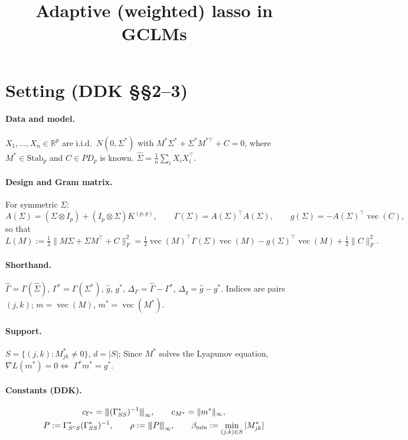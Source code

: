 \documentclass[11pt,a4paper]{article}
\title{\textbf{Adaptive (weighted) lasso in GCLMs}\\[0.4em]}
\author{}
\date{}
\numberwithin{equation}{section}
\theoremstyle{plain}
\theoremstyle{remark}
\newcommand{\opnorm}[1]{{\vert\kern-0.25ex\vert\kern-0.25ex\vert #1 \vert\kern-0.25ex\vert\kern-0.25ex\vert}}
\DeclareMathOperator{\vect}{vec}
\begin{document}
\maketitle

\section{Setting (DDK \S\S2--3)}\label{sec:setting}

\paragraph{Data and model.} $X_1,\dots,X_n\in\mathbb R^p$ are i.i.d.\ $N(0,\Sigma^*)$ with $M^*\Sigma^*+\Sigma^*M^{*\top}+C=0$, where $M^*\in\mathrm{Stab}_p$ and $C\in PD_p$ is known. $\hat\Sigma=\frac1n\sum_iX_iX_i^\top$.

\paragraph{Design and Gram matrix.} For symmetric $\Sigma$:
\[
A(\Sigma)=(\Sigma\otimes I_p)+(I_p\otimes\Sigma)K^{(p,p)},\qquad
\Gamma(\Sigma)=A(\Sigma)^\top A(\Sigma),\qquad
g(\Sigma)=-A(\Sigma)^\top\vect(C),
\]
so that
\[
L(M) := \tfrac12\|M\Sigma+\Sigma M^\top+C\|_F^2=\tfrac12\vect(M)^\top\Gamma(\Sigma)\vect(M)-g(\Sigma)^\top\vect(M)+\tfrac12\|C\|_F^2 .
\]

\paragraph{Shorthand.} $\hat\Gamma=\Gamma(\hat\Sigma)$, $\Gamma^*=\Gamma(\Sigma^*)$, $\hat g$, $g^*$, $\Delta_\Gamma=\hat\Gamma-\Gamma^*$, $\Delta_g=\hat g-g^*$. Indices are pairs $(j,k)$; $m=\vect(M)$, $m^*=\vect(M^*)$.

\paragraph{Support.} $S=\{(j,k):M^*_{jk}\ne0\}$, $d=|S|$; Since $M^*$ solves the Lyapunov equation, $\nabla L(m^*) = 0 \iff$ $\Gamma^*m^*=g^*$.

\paragraph{Constants (DDK).}
\begin{gather*}
c_{\Gamma^*}=\opnorm{(\Gamma^*_{SS})^{-1}}_\infty,\qquad c_{M^*}=\|m^*\|_\infty,\\
P:=\Gamma^*_{S^cS}(\Gamma^*_{SS})^{-1},\qquad \rho:=\opnorm{P}_\infty,\qquad \beta_{\min}:=\min_{(j,k)\in S}|M^*_{jk}|
\end{gather*}
\end{document}
